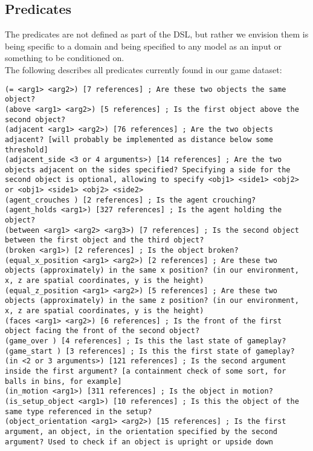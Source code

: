 \documentclass{article}
\begin{document}
\subsection{Predicates}
The predicates are not defined as part of the DSL, but rather we envision them is being specific to a domain and being specified to any model as an input or something to be conditioned on. \\
            
            The following describes all predicates currently found in our game dataset:
        
\begin{lstlisting}
(= <arg1> <arg2>) [7 references] ; Are these two objects the same object?
(above <arg1> <arg2>) [5 references] ; Is the first object above the second object?
(adjacent <arg1> <arg2>) [76 references] ; Are the two objects adjacent? [will probably be implemented as distance below some threshold]
(adjacent_side <3 or 4 arguments>) [14 references] ; Are the two objects adjacent on the sides specified? Specifying a side for the second object is optional, allowing to specify <obj1> <side1> <obj2> or <obj1> <side1> <obj2> <side2>
(agent_crouches ) [2 references] ; Is the agent crouching?
(agent_holds <arg1>) [327 references] ; Is the agent holding the object?
(between <arg1> <arg2> <arg3>) [7 references] ; Is the second object between the first object and the third object?
(broken <arg1>) [2 references] ; Is the object broken?
(equal_x_position <arg1> <arg2>) [2 references] ; Are these two objects (approximately) in the same x position? (in our environment, x, z are spatial coordinates, y is the height)
(equal_z_position <arg1> <arg2>) [5 references] ; Are these two objects (approximately) in the same z position? (in our environment, x, z are spatial coordinates, y is the height)
(faces <arg1> <arg2>) [6 references] ; Is the front of the first object facing the front of the second object?
(game_over ) [4 references] ; Is this the last state of gameplay?
(game_start ) [3 references] ; Is this the first state of gameplay?
(in <2 or 3 arguments>) [121 references] ; Is the second argument inside the first argument? [a containment check of some sort, for balls in bins, for example]
(in_motion <arg1>) [311 references] ; Is the object in motion?
(is_setup_object <arg1>) [10 references] ; Is this the object of the same type referenced in the setup?
(object_orientation <arg1> <arg2>) [15 references] ; Is the first argument, an object, in the orientation specified by the second argument? Used to check if an object is upright or upside down

\end{lstlisting}
\end{document}
